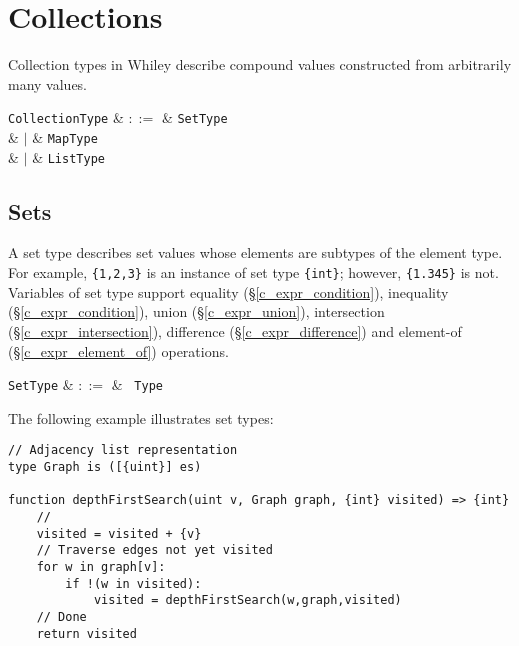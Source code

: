 
\section{Collections}
\label{c_types_collection}

Collection types in Whiley describe compound values constructed from arbitrarily many values.

\begin{syntax}
  \verb+CollectionType+ & $::=$ & \verb+SetType+\\
                        & $|$ & \verb+MapType+\\
                        & $|$ & \verb+ListType+\\
\end{syntax}



\subsection{Sets}
\label{c_types_set}

A set type describes set values whose elements are subtypes of the element type. For example, \lstinline|{1,2,3}| is an instance of set type \lstinline|{int}|; however, \lstinline|{1.345}| is not.  Variables of set type support equality (\S\ref{c_expr_condition}), inequality (\S\ref{c_expr_condition}), union (\S\ref{c_expr_union}), intersection (\S\ref{c_expr_intersection}), difference (\S\ref{c_expr_difference}) and element-of (\S\ref{c_expr_element_of}) operations.

\begin{syntax}
  \verb+SetType+ & $::=$ & \token{\{} \ \verb+Type+ \ \token{\}} \\
\end{syntax}

\noindent The following example illustrates set types:

\begin{lstlisting}
// Adjacency list representation
type Graph is ([{uint}] es)

function depthFirstSearch(uint v, Graph graph, {int} visited) => {int}
    //
    visited = visited + {v}
    // Traverse edges not yet visited
    for w in graph[v]:
        if !(w in visited):
            visited = depthFirstSearch(w,graph,visited)
    // Done
    return visited
\end{lstlisting}

